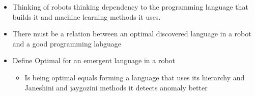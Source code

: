 \begin{itemize}
    \item Thinking of robots thinking dependency to the programming language that builds it and machine learning methods it uses.
    \item There must be a relation between an optimal discovered language in a robot and a good programming labguage
    \item Define Optimal for an emergent language in a robot
        \begin{itemize}
            \item Is being optimal equals forming a language that uses its hierarchy and Janeshini and jaygozini methods it detects anomaly better
        \end{itemize}
\end{itemize}